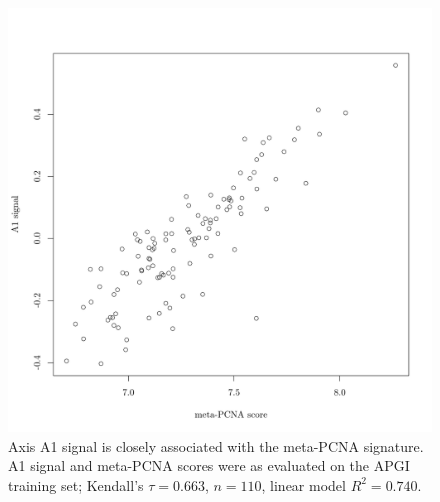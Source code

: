 \documentclass[dissertation.tex]{subfiles}
\begin{document}
\begin{figure}
\centering
\includegraphics[width=.7\linewidth]{analysis/biosurv/reports/18_SIS_diag_dsd_final/figure/nmf-msigdb-cor-plots-5}
\caption[A1 signal is closely associated with meta-PCNA score]{Axis A1 signal is closely associated with the meta-PCNA signature.  A1 signal and meta-PCNA \cite{Venet2011} scores were as evaluated on the \acrshort{APGI} training set; Kendall's $\tau = 0.663$, $n = 110$, linear model $R^2 = 0.740$.}\label{fig:sigs-axis1-pcna}
\end{figure}
\end{document}
